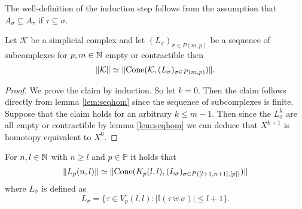 The well-definition of the induction step follows from the assumption that $A_\sigma \subseteq A_\tau$ if $\tau \subseteq \sigma$.

\begin{lemma}\label{lem:ecsimeq}
  Let $\mathcal{K}$ be a simplicial complex and let $(L_\sigma)_{\sigma \in P(m,p)}$ be a sequence of subcomplexes for $p,m \in \mathbb{N}$ empty or contractible then \[\lVert \mathcal{K} \rVert \simeq \lVert {\rm Cone}(\mathcal{K}, (L_\sigma)_{\sigma \in P(m,p)})\rVert.\]  
\end{lemma}

\begin{proof}
  We prove the claim by induction. So let $k = 0$. Then the claim follows directly from lemma \ref{lem:seqhom} since the sequence of subcomplexes is finite.
  Suppose that the claim holds for an arbitrary $k \leq m - 1$. Then since the $L^k_\sigma$ are all empty or contractible by lemma \ref{lem:seqhom} we can deduce that $X^{k+1}$ is homotopy equivalent to $X^0$.
\end{proof}

\begin{lemma}\label{lem:lnpkll}
  For $n,l \in \mathbb{N}$ with $n \geq l$ and $p \in \mathbb{P}$ it holds that \[\lVert L_p(n,l) \rVert \simeq \lVert {\rm Cone}(K_p(l,l), (L_\sigma)_{\sigma \in P([l+1,n+1],[p])})\rVert \] where $L_\sigma$ is defined as \[L_\sigma = \{\tau\in V_p(l,l)\colon \left|\mathbb{I}(\tau\uplus\sigma)\right| \leq l+1\}.\]
\end{lemma}

